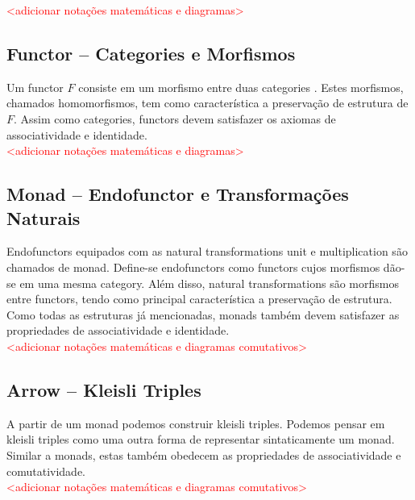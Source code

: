 \documentclass[10pt, conference]{IEEEtran}
\begin{document}
\textcolor{red}{<adicionar notações matemáticas e diagramas>}

\subsection{Functor -- Categories e Morfismos}

Um functor $F$ consiste em um morfismo entre duas categories \cite{maclane1971mat}. Estes morfismos, chamados homomorfismos, tem como característica a preservação de estrutura de $F$. Assim como categories, functors devem satisfazer os axiomas de associatividade e identidade.\\

\textcolor{red}{<adicionar notações matemáticas e diagramas>}

\subsection{Monad -- Endofunctor e Transformações Naturais}

Endofunctors equipados com as natural transformations unit e multiplication \cite{maclane1971mat} são chamados de monad. Define-se endofunctors como functors cujos morfismos dão-se em uma mesma category. Além disso, natural transformations são morfismos entre functors, tendo como principal característica a preservação de estrutura. Como todas as estruturas já mencionadas, monads também devem satisfazer as propriedades de associatividade e identidade.\\

\textcolor{red}{<adicionar notações matemáticas e diagramas comutativos>}

\subsection{Arrow -- Kleisli Triples}

A partir de um monad podemos construir kleisli triples. Podemos pensar em kleisli triples como uma outra forma de representar sintaticamente um monad. Similar a monads, estas também obedecem as propriedades de associatividade e comutatividade.\\

\textcolor{red}{<adicionar notações matemáticas e diagramas comutativos>}



\end{document}
